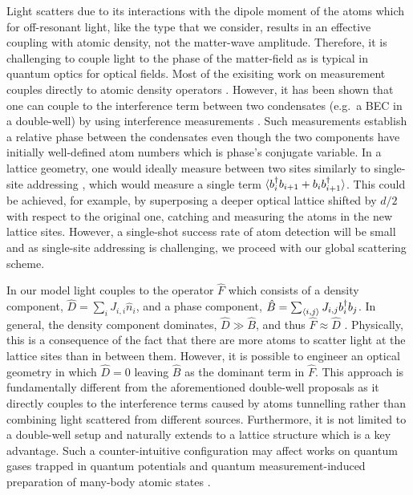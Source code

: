 Light scatters due to its interactions with the dipole moment of the
atoms which for off-resonant light, like the type that we consider,
results in an effective coupling with atomic density, not the
matter-wave amplitude. Therefore, it is challenging to couple light to
the phase of the matter-field as is typical in quantum optics for
optical fields. Most of the exisiting work on measurement couples
directly to atomic density operators \cite{mekhov2012, LP2009,
  rogers2014, ashida2015, ashida2015a}. However, it has been shown
that one can couple to the interference term between two condensates
(e.g.~a BEC in a double-well) by using interference measurements
\cite{cirac1996, castin1997, ruostekoski1997, ruostekoski1998,
  rist2012}. Such measurements establish a relative phase between the
condensates even though the two components have initially well-defined
atom numbers which is phase's conjugate variable. In a lattice
geometry, one would ideally measure between two sites similarly to
single-site addressing \cite{greiner2009, bloch2011}, which would
measure a single term $\langle b^\dagger_i b_{i+1}+b_i
b^\dagger_{i+1}\rangle$. This could be achieved, for example, by superposing
a deeper optical lattice shifted by $d/2$ with respect to the original
one, catching and measuring the atoms in the new lattice
sites. However, a single-shot success rate of atom detection will be
small and as single-site addressing is challenging, we proceed with
our global scattering scheme.

In our model light couples to the operator $\hat{F}$ which consists of
a density component, $\hat{D} = \sum_i J_{i,i} \hat{n}_i$, and a phase
component, $\hat{B} = \sum_{\langle i, j \rangle} J_{i,j} b^\dagger_i
b_j$. In general, the density component dominates,
$\hat{D} \gg \hat{B}$, and thus $\hat{F} \approx \hat{D}$
\cite{mekhov2012}. Physically, this is a consequence of the fact that
there are more atoms to scatter light at the lattice sites than in
between them. However, it is possible to engineer an optical geometry
in which $\hat{D} = 0$ leaving $\hat{B}$ as the dominant term in
$\hat{F}$. This approach is fundamentally different from the
aforementioned double-well proposals as it directly couples to the
interference terms caused by atoms tunnelling rather than combining
light scattered from different sources. Furthermore, it is not limited
to a double-well setup and naturally extends to a lattice structure
which is a key advantage. Such a counter-intuitive configuration may
affect works on quantum gases trapped in quantum potentials
\cite{mekhov2012, mekhov2008, larson2008, chen2009, habibian2013,
  ivanov2014, caballero2015} and quantum measurement-induced
preparation of many-body atomic states \cite{mazzucchi2016,
  mekhov2009prl, pedersen2014, elliott2015}.

